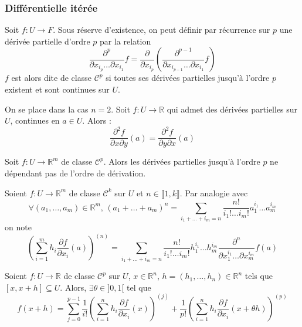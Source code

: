 	\subsubsection{Différentielle itérée}
	
	\begin{definition}
		Soit $f : U \rightarrow F$. Sous réserve d'existence, on peut définir par récurrence sur $p$ une dérivée partielle d'ordre $p$ par la relation
		\[ \frac{\partial^p}{\partial x_{i_p} \dots \partial x_{i_1}} f = \frac{\partial}{\partial x_{i_p}} \left( \frac{\partial^{p-1}}{\partial x_{i_{p-1}} \dots \partial x_{i_1}} f \right) \]
		$f$ est alors dite de classe $\mathcal{C}^p$ si toutes ses dérivées partielles jusqu'à l'ordre $p$ existent et sont continues sur $U$.
	\end{definition}
	
	
	\begin{theorem}[Schwarz]
		On se place dans la cas $n = 2$. Soit $f : U \rightarrow \mathbb{R}$ qui admet des dérivées partielles sur $U$, continues en $a \in U$. Alors :
		\[ \frac{\partial^2 f}{\partial x \partial y}(a) = \frac{\partial^2 f}{\partial y \partial x}(a) \]
	\end{theorem}
	
	\begin{corollary}
		Soit $f : U \rightarrow \mathbb{R}^m$ de classe $\mathcal{C}^p$. Alors les dérivées partielles jusqu'à l'ordre $p$ ne dépendant pas de l'ordre de dérivation.
	\end{corollary}
	
	\begin{notation}
		Soient $f : U \rightarrow \mathbb{R}^m$ de classe $\mathcal{C}^k$ sur $U$ et $n \in \llbracket 1, k \rrbracket$. Par analogie avec
		\[ \forall (a_1, \dots, a_m) \in \mathbb{R}^m, \, (a_1 + \dots + a_m)^n = \sum_{i_1+\dots+i_m=n} \frac{n!}{i_1! \dots i_m!} a_1^{i_1} \dots a_m^{i_m} \]
		on note
		\[ \left( \sum_{i=1}^m h_i \frac{\partial f}{\partial x_i} (a) \right)^{(n)} = \sum_{i_1+\dots+i_m=n} \frac{n!}{i_1! \dots i_m!} h_1^{i_1} \dots h_m^{i_m} \frac{\partial^n}{\partial x_1^{i_1} \dots \partial x_m^{i_m}} f(a) \]
	\end{notation}
	
	\begin{theorem}
		Soient $f : U \rightarrow \mathbb{R}$ de classe $\mathcal{C}^p$ sur $U$, $x \in \mathbb{R}^n$, $h = (h_1, \dots, h_n) \in \mathbb{R}^n$ tels que $[x,x+h] \subseteq U$. Alors, $\exists \theta \in ]0,1[$ tel que
		\[ f(x+h) = \sum_{j=0}^{p-1} \frac{1}{i!} \left( \sum_{i=1}^n h_i \frac{\partial f}{\partial x_i} (x) \right)^{(j)} + \frac{1}{p!} \left( \sum_{i=1}^n h_i \frac{\partial f}{\partial x_i} (x + \theta h) \right)^{(p)} \]
	\end{theorem}
	

